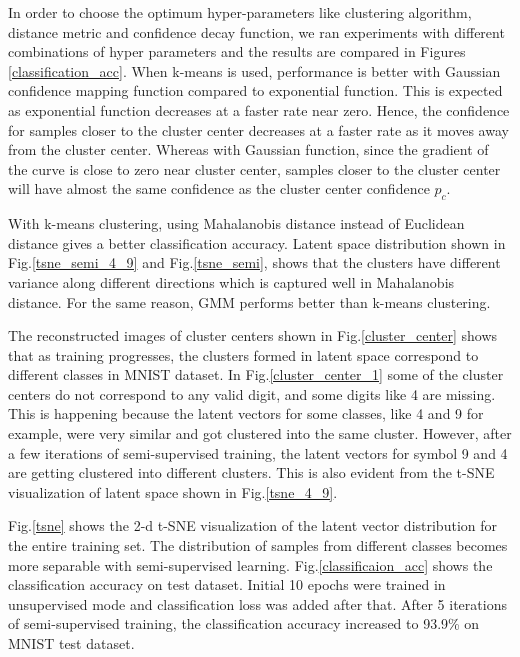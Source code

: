 \documentclass[runningheads]{llncs}
\begin{document}
In order to choose the optimum hyper-parameters like clustering algorithm, distance metric and confidence decay function, we ran experiments with different combinations of hyper parameters and the results are compared in Figures \ref{classification_acc}.
When k-means is used, performance is better with Gaussian confidence mapping function compared to exponential function.
This is expected as exponential function decreases at a faster rate near zero.
Hence, the confidence for samples closer to the cluster center decreases at a faster rate as it moves away from the cluster center.
Whereas  with Gaussian function, since the gradient of the curve is close to zero near cluster center, samples closer to the cluster center will have almost the same confidence as the cluster center confidence $p_c$.

With k-means clustering, using Mahalanobis distance instead of Euclidean distance gives a better classification accuracy.
Latent space distribution shown in Fig.\ref{tsne_semi_4_9} and Fig.\ref{tsne_semi}, shows that the clusters have different variance along different directions which is captured well in Mahalanobis distance.
For the same reason, GMM performs better than k-means clustering.

The reconstructed images of cluster centers shown in Fig.\ref{cluster_center} shows that as training progresses, the clusters formed in latent space correspond to different classes in MNIST dataset.
In Fig.\ref{cluster_center_1} some of the cluster centers do not correspond to any valid digit, and some digits like 4  are missing.
This is happening because the latent vectors for some classes, like  4 and 9 for example,  were very similar and got clustered into the same cluster.
However, after a few iterations of semi-supervised training, the latent vectors for symbol 9 and 4 are getting clustered into different clusters.
This is also evident from the t-SNE visualization of latent space shown in Fig.\ref{tsne_4_9}.

Fig.\ref{tsne} shows the 2-d t-SNE visualization of the latent vector distribution for the entire training set.
The distribution of samples from different classes becomes more separable with semi-supervised learning.
Fig.\ref{classificaion_acc} shows the  classification accuracy on test dataset.
Initial 10 epochs were trained in unsupervised mode and classification loss was added after that.
After 5 iterations of semi-supervised training, the classification accuracy increased to 93.9\% on MNIST test dataset.
\end{document}
